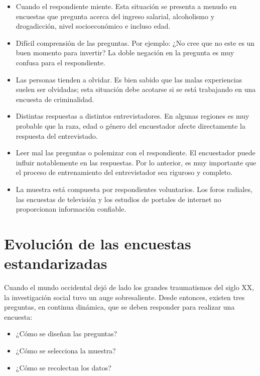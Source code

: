 \documentclass[
  10pt,
  spanish,
]{book}
\providecommand{\tightlist}{%
  \setlength{\itemsep}{0pt}\setlength{\parskip}{0pt}}
\begin{document}
\begin{itemize}
\tightlist
\item
  Cuando el respondiente miente. Esta situación se presenta a menudo en encuestas que pregunta acerca del ingreso salarial, alcoholismo y drogadicción, nivel socioeconómico e incluso edad.
\item
  Difícil comprensión de las preguntas. Por ejemplo: ¿No cree que no este es un buen momento para invertir? La doble negación en la pregunta es muy confusa para el respondiente.
\item
  Las personas tienden a olvidar. Es bien sabido que las malas experiencias suelen ser olvidadas; esta situación debe acotarse si se está trabajando en una encuesta de criminalidad.
\item
  Distintas respuestas a distintos entrevistadores. En algunas regiones es muy probable que la raza, edad o género del encuestador afecte directamente la respuesta del entrevistado.
\item
  Leer mal las preguntas o polemizar con el respondiente. El encuestador puede influir notablemente en las respuestas. Por lo anterior, es muy importante que el proceso de entrenamiento del entrevistador sea riguroso y completo.
\item
  La muestra está compuesta por respondientes voluntarios. Los foros radiales, las encuestas de televisión y los estudios de portales de internet no proporcionan información confiable.
\end{itemize}

\hypertarget{evoluciuxf3n-de-las-encuestas-estandarizadas}{%
\section{Evolución de las encuestas estandarizadas}\label{evoluciuxf3n-de-las-encuestas-estandarizadas}}

Cuando el mundo occidental dejó de lado los grandes traumatismos del siglo XX, la investigación social tuvo un auge sobresaliente. Desde entonces, existen tres preguntas, en continua dinámica, que se deben responder para realizar una encuesta:

\begin{itemize}
\tightlist
\item
  ¿Cómo se diseñan las preguntas?
\item
  ¿Cómo se selecciona la muestra?
\item
  ¿Cómo se recolectan los datos?
\end{itemize}
\end{document}
